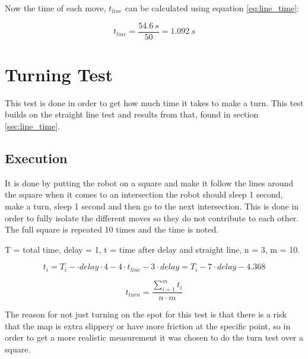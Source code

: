 \documentclass[a4paper,10pt]{article}
\begin{document}
Now the time of each move, $t_{line}$ can be calculated using equation \ref{eq:line_time}:

$$
t_{line} = \frac{54.6\ s}{50} = 1.092\ s
$$

\section{Turning Test} \label{sec:turn_time}

This test is done in order to get how much time it takes to make a turn. This test builds on the straight line test and results from that, found in section \ref{sec:line_time}.

\subsection{Execution}
It is done by putting the robot on a square and make it follow the lines around the square when it comes to an intersection the robot should sleep 1 second, make a turn, sleep 1 second and then go to the next intersection. This is done in order to fully isolate the different moves so they do not contribute to each other. The full square is repeated 10 times and the time is noted. 

T = total time, delay = 1, t = time after delay and straight line, n = 3, m = 10.

\begin{equation} \label{eq:time_delay_turn}
t_i = T_i - \cdot delay\cdot 4 - 4\cdot t_{line} - 3 \cdot delay = T_i - 7 \cdot delay - 4.368
\end{equation}

\begin{equation} \label{eq:turn_time}
t_{turn} = \frac{\sum_{i=1}^m t_i}{n\cdot m}
\end{equation}

The reason for not just turning on the spot for this test is that there is a risk that the map is extra slippery or have more friction at the specific point, so in order to get a more realistic measurement it was chosen to do the turn test over a square. 
\end{document}
